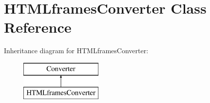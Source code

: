 \hypertarget{class_h_t_m_lframes_converter}{\section{\-H\-T\-M\-Lframes\-Converter \-Class \-Reference}
\label{class_h_t_m_lframes_converter}
}
\-Inheritance diagram for \-H\-T\-M\-Lframes\-Converter\-:\begin{figure}[H]
\begin{center}
\leavevmode
\includegraphics[height=2.000000cm]{class_h_t_m_lframes_converter}
\end{center}
\end{figure}
